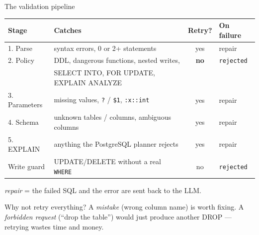 \documentclass[aspectratio=169,10pt]{beamer}
\begin{document}
\begin{frame}{The validation pipeline}
  \centering
  \begin{tabular}{@{}llcl@{}}
    \toprule
    \textbf{Stage} & \textbf{Catches} & \textbf{Retry?} & \textbf{On failure} \\
    \midrule
    1. Parse      & syntax errors, 0 or 2+ statements                & yes & repair \\
    2. Policy     & DDL, dangerous functions, nested writes,         & \textbf{no} & \texttt{rejected} \\
                  & SELECT INTO, FOR UPDATE, EXPLAIN ANALYZE          &     & \\
    3. Parameters & missing values, \texttt{?} / \texttt{\$1}, \texttt{:x::int} & yes & repair \\
    4. Schema     & unknown tables / columns, ambiguous columns      & yes & repair \\
    5. EXPLAIN    & anything the PostgreSQL planner rejects          & yes & repair \\
    \midrule
    Write guard   & UPDATE/DELETE without a real \texttt{WHERE}      & no  & \texttt{rejected} \\
    \bottomrule
  \end{tabular}

  \vspace{4pt}
  {\footnotesize \emph{repair} = the failed SQL and the error are sent back to the LLM.}

  \vspace{6pt}
  \begin{block}{Why not retry everything?}
    \footnotesize
    A \emph{mistake} (wrong column name) is worth fixing. A \emph{forbidden request}
    (``drop the table'') would just produce another DROP --- retrying wastes
    time and money.
  \end{block}
\end{frame}
\end{document}
